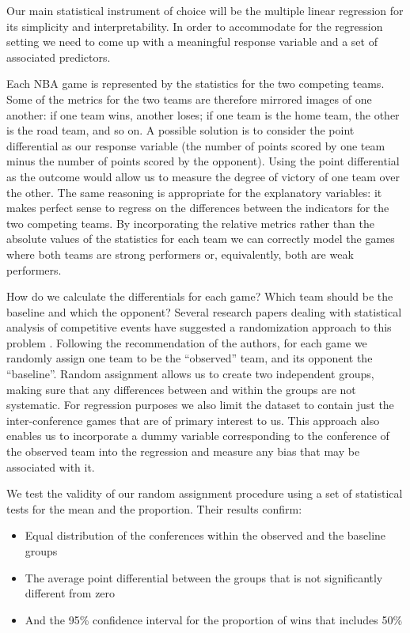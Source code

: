 \documentclass[
    12pt,
    a4paper,
    titlepage,  %
    abstract,  %
    headings=standardclasses,  %
    bibliography=totocnumbered  %
]{scrartcl}
\begin{document}
Our main statistical instrument of choice will be the multiple linear regression for its simplicity and interpretability. In order to accommodate for the regression setting we need to come up with a meaningful response variable and a set of associated predictors.

Each NBA game is represented by the statistics for the two competing teams. Some of the metrics for the two teams are therefore mirrored images of one another: if one team wins, another loses; if one team is the home team, the other is the road team, and so on. A possible solution is to consider the point differential as our response variable (the number of points scored by one team minus the number of points scored by the opponent). Using the point differential as the outcome would allow us to measure the degree of victory of one team over the other. The same reasoning is appropriate for the explanatory variables: it makes perfect sense to regress on the differences between the indicators for the two competing teams. By incorporating the relative metrics rather than the absolute values of the statistics for each team we can correctly model the games where both teams are strong performers or, equivalently, both are weak performers. 

How do we calculate the differentials for each game? Which team should be the baseline and which the opponent? Several research papers dealing with statistical analysis of competitive events have suggested a randomization approach to this problem \cite{carmichael, leard, carr}. Following the recommendation of the authors, for each game we randomly assign one team to be the ``observed'' team, and its opponent the ``baseline''. Random assignment allows us to create two independent groups, making sure that any differences between and within the groups are not systematic. For regression purposes we also limit the dataset to contain just the inter-conference games that are of primary interest to us. This approach also enables us to incorporate a dummy variable corresponding to the conference of the observed team into the regression and measure any bias that may be associated with it.

We test the validity of our random assignment procedure using a set of statistical tests for the mean and the proportion. Their results confirm:

\begin{itemize}
    \item Equal distribution of the conferences within the observed and the baseline groups
    \item The average point differential between the groups that is not significantly different from zero
    \item And the 95\% confidence interval for the proportion of wins that includes 50\%
\end{itemize}
\end{document}
